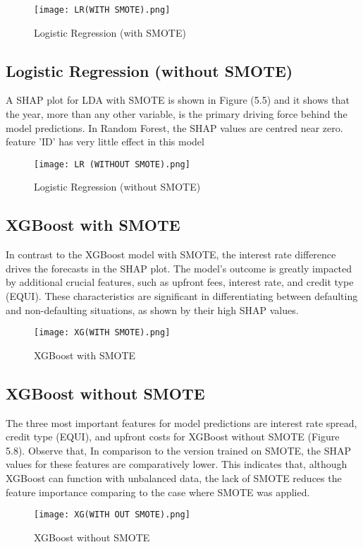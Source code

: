 \documentclass[12pt, a4paper,oneside]{book}
\numberwithin{equation}{section}
\begin{document}
\begin{figure}[ht]
    \centering
    \texttt{[image: LR(WITH SMOTE).png]}
    \caption{Logistic Regression (with SMOTE)}
    \label{fig:enter-label}
\end{figure}

\newpage
\subsection{Logistic Regression (without SMOTE)}
A SHAP plot for LDA with SMOTE is shown in Figure (5.5) and it shows that the year, more than any other variable, is the primary driving force behind the model predictions. In Random Forest, the SHAP values are centred near zero. feature 'ID' has very little effect in this model
\begin{figure}[ht]
    \centering
    \texttt{[image: LR (WITHOUT SMOTE).png]}
    \caption{Logistic Regression (without SMOTE)}
    \label{fig:enter-label}
\end{figure}


\newpage
\subsection{XGBoost with SMOTE}
In contrast to the XGBoost model with SMOTE, the interest rate difference drives the forecasts in the SHAP plot. The model's outcome is greatly impacted by additional crucial features, such as upfront fees, interest rate, and credit type (EQUI). These characteristics are significant in differentiating between defaulting and non-defaulting situations, as shown by their high SHAP values.
\begin{figure}[ht]
    \centering
    \texttt{[image: XG(WITH SMOTE).png]}
    \caption{XGBoost with SMOTE}
    \label{fig:enter-label}
\end{figure}

\newpage
\subsection{XGBoost without SMOTE}
The three most important features for model predictions are interest rate spread, credit type (EQUI), and upfront costs for XGBoost without SMOTE (Figure 5.8). Observe that, In comparison to the version trained on SMOTE, the SHAP values for these features are comparatively lower. This indicates that, although XGBoost can function with unbalanced data, the lack of SMOTE reduces the feature importance comparing to the case where SMOTE was applied.
\begin{figure}[ht]
    \centering
    \texttt{[image: XG(WITH OUT SMOTE).png]}
    \caption{XGBoost without SMOTE}
    \label{fig:enter-label}
\end{figure}
\end{document}
